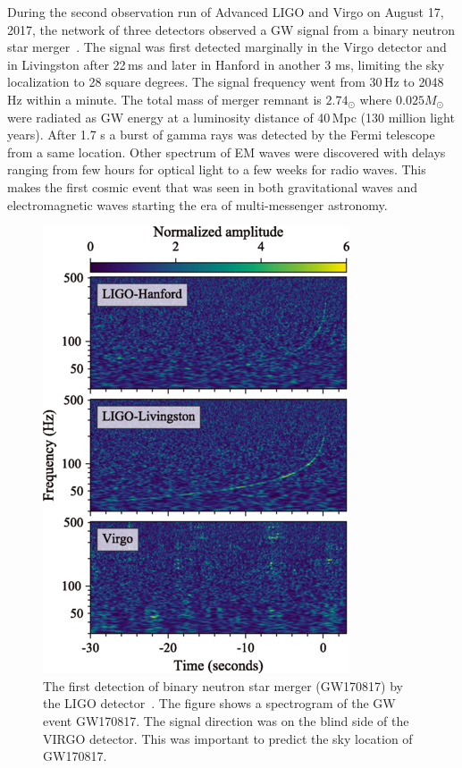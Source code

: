 \documentclass{ttuthes2007}
\begin{document}
During the second observation run of Advanced LIGO and Virgo on August 17, 2017,
the network of three detectors observed a \ac{GW} signal from a binary
neutron star merger~\cite{Abbott_2017}. The signal was first detected marginally in the Virgo
detector and in Livingston after 22\,ms and later in Hanford in another 3 ms,
limiting the sky localization to 28 square degrees. The signal frequency went
from 30\,Hz to 2048\,Hz within a minute. The total mass of merger remnant
is $2.74_\odot$ where $0.025 M_\odot$ were radiated as \ac{GW} energy at a
luminosity distance of 40\,Mpc (130 million light years). After 1.7 s a
burst of gamma rays was detected by the Fermi telescope from a same  location. Other
spectrum of \ac{EM} waves were discovered with delays ranging from few hours for optical
light to a few weeks for radio waves.  This makes the first cosmic event that
was seen in both gravitational waves and electromagnetic waves starting the era
of multi-messenger astronomy. 
\begin{figure}[bhtp!] 
        \includegraphics[width=\textwidth]{figure/GW170817.png}
	\caption{The first detection of binary neutron star merger (GW170817) by
the \ac{LIGO} detector~\cite{Abbott_2017}. The figure shows a spectrogram of the \ac{GW} event
GW170817. The signal direction was on the blind side of the VIRGO detector. This
was important to predict the sky location of GW170817.  }
        \label{GW170817}                                                             
\end{figure}      
\end{document}
